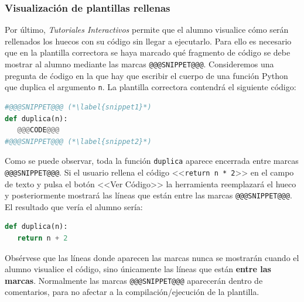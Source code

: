 \documentclass[]{article}
\newcommand{\code}[1]{{\lstinline[basicstyle=\ttfamily,mathescape]!#1!}}
\newcommand{\toolname}{\emph{Tutoriales Interactivos}}
\begin{document}
\subsubsection{Visualización de plantillas rellenas}
Por último, \toolname{} permite que el alumno visualice cómo serán rellenados los huecos con su código sin llegar a ejecutarlo. Para ello es necesario que en la plantilla correctora se haya marcado qué fragmento de código se debe mostrar al alumno mediante las marcas \code{@@@SNIPPET@@@}. Consideremos una pregunta de ćodigo en la que hay que escribir el cuerpo de una función Python que duplica el argumento \code{n}. La plantilla correctora contendrá el siguiente código:
\begin{lstlisting}[language=Python,basicstyle=\ttfamily, otherkeywords={with}]
#@@@SNIPPET@@@ (*\label{snippet1}*)
def duplica(n):
   @@@CODE@@@
#@@@SNIPPET@@@ (*\label{snippet2}*)
\end{lstlisting}
Como se puede observar, toda la función \code{duplica} aparece encerrada entre marcas \code{@@@SNIPPET@@@}. Si el usuario rellena el código <<\code{return n * 2}>> en el campo de texto y pulsa el botón <<Ver Código>> la herramienta reemplazará el hueco y posteriormente mostrará las líneas que están entre las marcas \code{@@@SNIPPET@@@}. El resultado que vería el alumno sería:
\begin{lstlisting}[language=Python,basicstyle=\ttfamily, otherkeywords={with}]
def duplica(n):
   return n + 2
\end{lstlisting}
Obsérvese que las líneas donde aparecen las marcas nunca se mostrarán cuando el alumno visualice el código, sino únicamente las líneas que están \textbf{entre las marcas}. Normalmente las marcas \code{@@@SNIPPET@@@} aparecerán dentro de comentarios, para no afectar a la compilación/ejecución de la plantilla.
\end{document}
